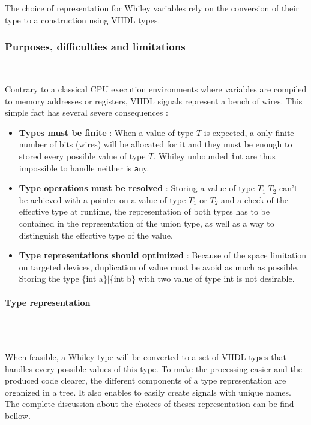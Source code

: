 \documentclass[10pt,a4paper]{article}
\newcommand{\code}{\texttt}
\renewcommand{\indent}{~\\\vspace{-.8cm}}
\begin{document}
The choice of representation for Whiley variables rely on the conversion of their type to a construction using VHDL types.

\subsubsection{Purposes, difficulties and limitations}
\indent


Contrary to a classical CPU execution environments where variables are compiled to memory addresses or registers, VHDL signals represent a bench of wires. This simple fact has several severe consequences :

\begin{itemize}
	\item \textbf{Types must be finite} : When a value of type $T$ is expected, a only finite number of bits (wires) will be allocated for it and they must be enough to stored every possible value of type $T$. Whiley unbounded \code int are thus impossible to handle neither is \code any.
	
	\item \textbf{Type operations must be resolved} : Storing a value of type $T_1|T_2$ can't be achieved with a pointer on a value of type $T_1$ or $T_2$ and a check of the effective type at runtime, the representation of both types has to be contained in the representation of the union type, as well as a way to distinguish the effective type of the value.
	
	\item \textbf{Type representations should optimized} : Because of the space limitation on targeted devices, duplication of value must be avoid as much as possible. Storing the type \{int a\}$|$\{int b\} with two value of type int is not desirable.
\end{itemize}

\paragraph{Type representation}~\\\indent

When feasible, a Whiley type will be converted to a set of VHDL types that handles every possible values of this type. To make the processing easier and the produced code clearer, the different components of a type representation are organized in a tree. It also enables to easily create signals with unique names.
The complete discussion about the choices of theses representation can be find \hyperref[Repr]{bellow}.
\end{document}
